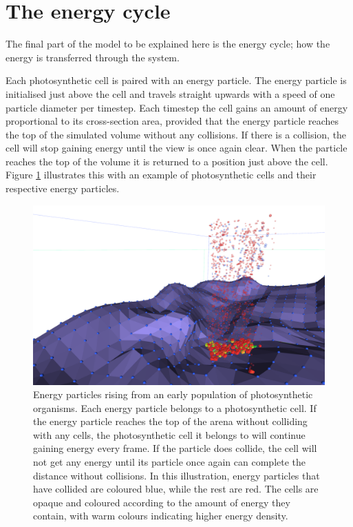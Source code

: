 \section{The energy cycle}\label{sec:EnergyCycle}
The final part of the model to be explained here is the energy cycle; how the energy is transferred through the system.

Each photosynthetic cell is paired with an energy particle. The energy particle is initialised just above the cell and travels straight upwards with a speed of one particle diameter per timestep. Each timestep the cell gains an amount of energy proportional to its cross-section area, provided that the energy particle reaches the top of the simulated volume without any collisions. If there is a collision, the cell will stop gaining energy until the view is once again clear. When the particle reaches the top of the volume it is returned to a position just above the cell. Figure \ref{fig:energyParticles} illustrates this with an example of photosynthetic cells and their respective energy particles.

\begin{figure}
  \begin{center}
  \includegraphics[width=\textwidth]{figure/energyParticles}
  \caption{
    Energy particles rising from an early population of photosynthetic organisms. Each energy particle belongs to a photosynthetic cell. If the energy particle reaches the top of the arena without colliding with any cells, the photosynthetic cell it belongs to will continue gaining energy every frame. If the particle does collide, the cell will not get any energy until its particle once again can complete the distance without collisions. In this illustration, energy particles that have collided are coloured blue, while the rest are red. The cells are opaque and coloured according to the amount of energy they contain, with warm colours indicating higher energy density.  
  }
  \label{fig:energyParticles}
  \end{center}
\end{figure}

